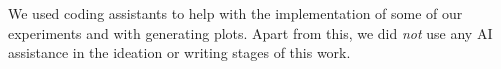 We used coding assistants to help with the implementation of some of our experiments and with generating plots. Apart from this, we did \emph{not} use any AI assistance in the ideation or writing stages of this work.